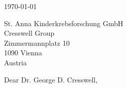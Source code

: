 \clearpage
\pagestyle{plain}
\begingroup
\setlength{\parindent}{0pt}
\setlength{\parskip}{6pt}
\fontfamily{\familydefault}\selectfont
\begin{center}
\end{center}
\begin{flushright}
\small
\today\\
\normalfont
\end{flushright}
\begin{flushleft}
\small
St. Anna Kinderkrebsforschung GmbH\\
Cresswell Group\\
Zimmermannplatz 10\\
1090 Vienna \\
Austria
\normalsize
\end{flushleft}

\noindent Dear Dr. George D. Cresswell, %
\vspace{1em}




